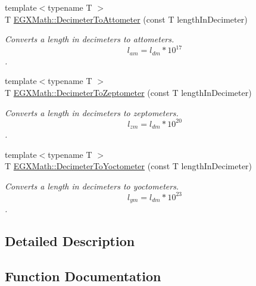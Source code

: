 \begin{DoxyCompactItemize}
{\footnotesize template$<$typename T $>$ }\\T \mbox{\hyperlink{group___e_g_x_math-_conversions-_length_conversions-_s_i-_decimeter-_s_i_ga9b13c4c4f05e01a1e28293b26b69e01a}{E\+G\+X\+Math\+::\+Decimeter\+To\+Attometer}} (const T length\+In\+Decimeter)
\begin{DoxyCompactList}\small\item\em Converts a length in decimeters to attometers. \[ l_{am}=l_{dm} * 10^{17} \]. \end{DoxyCompactList}\item 
{\footnotesize template$<$typename T $>$ }\\T \mbox{\hyperlink{group___e_g_x_math-_conversions-_length_conversions-_s_i-_decimeter-_s_i_ga5462e9c56431f0cf1daeafb729eeed24}{E\+G\+X\+Math\+::\+Decimeter\+To\+Zeptometer}} (const T length\+In\+Decimeter)
\begin{DoxyCompactList}\small\item\em Converts a length in decimeters to zeptometers. \[ l_{zm}=l_{dm} * 10^{20} \]. \end{DoxyCompactList}\item 
{\footnotesize template$<$typename T $>$ }\\T \mbox{\hyperlink{group___e_g_x_math-_conversions-_length_conversions-_s_i-_decimeter-_s_i_ga9da3b12a8bfe244f7af0cc13cf0de4a8}{E\+G\+X\+Math\+::\+Decimeter\+To\+Yoctometer}} (const T length\+In\+Decimeter)
\begin{DoxyCompactList}\small\item\em Converts a length in decimeters to yoctometers. \[ l_{ym}=l_{dm} * 10^{23} \]. \end{DoxyCompactList}\end{DoxyCompactItemize}


\subsection{Detailed Description}


\subsection{Function Documentation}
\mbox{\label{group___e_g_x_math-_conversions-_length_conversions-_s_i-_decimeter-_s_i_ga9b13c4c4f05e01a1e28293b26b69e01a}} 
